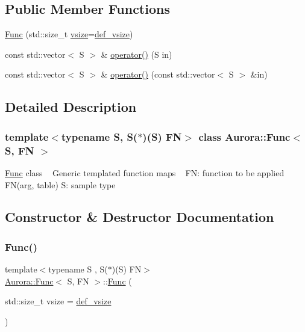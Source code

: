 \subsection*{Public Member Functions}
\begin{DoxyCompactItemize}
\item 
\hyperlink{class_aurora_1_1_func_a2a97c0f4eaf70c7e922876debeb14abe}{Func} (std\+::size\+\_\+t \hyperlink{class_aurora_1_1_snd_base_af9e21aaf411b17f7a8221c991ce5d291}{vsize}=\hyperlink{namespace_aurora_afaaddf667a06e7ce23c667a8b7295263}{def\+\_\+vsize})
\item 
const std\+::vector$<$ S $>$ \& \hyperlink{class_aurora_1_1_func_a90363ee6e98044131fdceb8ce9bcd4d6}{operator()} (S in)
\item 
const std\+::vector$<$ S $>$ \& \hyperlink{class_aurora_1_1_func_aa7664032aef8be96cdfd33b968a1f226}{operator()} (const std\+::vector$<$ S $>$ \&in)
\end{DoxyCompactItemize}


\subsection{Detailed Description}
\subsubsection*{template$<$typename S, S($\ast$)(\+S) FN$>$\newline
class Aurora\+::\+Func$<$ S, F\+N $>$}

\hyperlink{class_aurora_1_1_func}{Func} class ~\newline
Generic templated function maps ~\newline
FN\+: function to be applied F\+N(arg, table) S\+: sample type 

\subsection{Constructor \& Destructor Documentation}
\mbox{\label{class_aurora_1_1_func_a2a97c0f4eaf70c7e922876debeb14abe}} 
\subsubsection{\texorpdfstring{Func()}{Func()}}
{\footnotesize\ttfamily template$<$typename S , S($\ast$)(\+S) FN$>$ \\
\hyperlink{class_aurora_1_1_func}{Aurora\+::\+Func}$<$ S, FN $>$\+::\hyperlink{class_aurora_1_1_func}{Func} (\begin{DoxyParamCaption}\item[{std\+::size\+\_\+t}]{vsize = {\ttfamily \hyperlink{namespace_aurora_afaaddf667a06e7ce23c667a8b7295263}{def\+\_\+vsize}} }\end{DoxyParamCaption})\hspace{0.3cm}{\ttfamily [inline]}}

